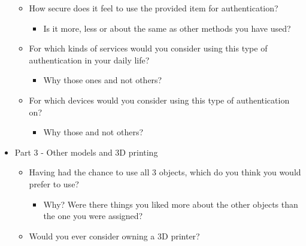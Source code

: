 \documentclass{l4proj}
\begin{document}
\begin{appendices}
\begin{itemize}
\begin{itemize}
\begin{itemize}
        \end{itemize}
        \item How secure does it feel to use the provided item for authentication?
        \begin{itemize}
            \item Is it more, less or about the same as other methods you have used?
        \end{itemize}
        \item For which kinds of services would you consider using this type of authentication in your daily life?
        \begin{itemize}
            \item Why those ones and not others?
        \end{itemize}
        \item For which devices would you consider using this type of authentication on?
        \begin{itemize}
            \item Why those and not others?
        \end{itemize}
    \end{itemize}
    \item Part 3 - Other models and 3D printing
    \begin{itemize}
        \item Having had the chance to use all 3 objects, which do you think you would prefer to use?
        \begin{itemize}
            \item Why? Were there things you liked more about the other objects than the one you were assigned?
        \end{itemize}
        \item Would you ever consider owning a 3D printer?
    \end{itemize}
    
\end{itemize}


\end{appendices}
\end{document}
